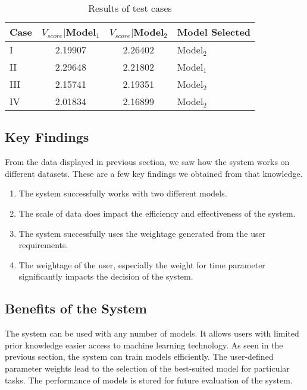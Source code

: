 \begin{table}[ht]
    \caption{Results of test cases}\label{tab:results_of_test_cases}
    \begin{tabular*}{\tblwidth}{@{}LCCL@{}}
        \toprule
        Case & $V_{score}|$Model$_1$ & $V_{score}|$Model$_2$ & Model Selected \\
        \midrule
        I & 2.19907 & 2.26402 & Model$_2$ \\
        II & 2.29648 & 2.21802 & Model$_1$ \\
        III & 2.15741 & 2.19351 & Model$_2$ \\
        IV & 2.01834 & 2.16899 & Model$_2$ \\
        \bottomrule
    \end{tabular*}
\end{table}

\subsection{Key Findings}\label{subsec:key_findings}

From the data displayed in previous section, we saw how the system works on different datasets. These are a few key findings we obtained from that knowledge.
\begin{enumerate}
    \item The system successfully works with two different models.
    \item The scale of data does impact the efficiency and effectiveness of the system.
    \item The system successfully uses the weightage generated from the user requirements.
    \item The weightage of the user, especially the weight for time parameter significantly impacts the decision of the system.
\end{enumerate}

\subsection{Benefits of the System}\label{subsec:benefits_of_system}

The system can be used with any number of models. It allows users with limited prior knowledge easier access to machine learning technology. As seen in the previous section, the system can train models efficiently. The user-defined parameter weights lead to the selection of the best-suited model for particular tasks. The performance of models is stored for future evaluation of the system.

